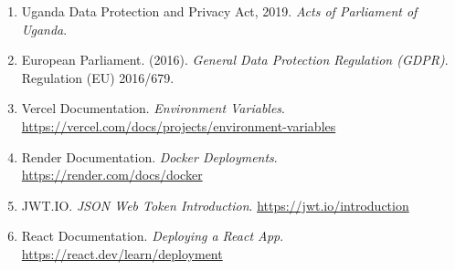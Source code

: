 \documentclass[12pt,a4paper]{article}
\begin{document}
\begin{enumerate}
    \item Uganda Data Protection and Privacy Act, 2019. \textit{Acts of Parliament of Uganda}.
    \item European Parliament. (2016). \textit{General Data Protection Regulation (GDPR)}. Regulation (EU) 2016/679.
    \item Vercel Documentation. \textit{Environment Variables}. \url{https://vercel.com/docs/projects/environment-variables}
    \item Render Documentation. \textit{Docker Deployments}. \url{https://render.com/docs/docker}
    \item JWT.IO. \textit{JSON Web Token Introduction}. \url{https://jwt.io/introduction}
    \item React Documentation. \textit{Deploying a React App}. \url{https://react.dev/learn/deployment}
\end{enumerate}
\end{document}
